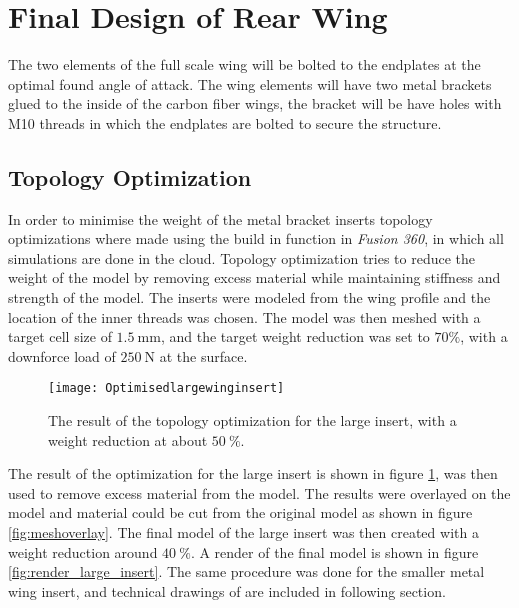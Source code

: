 \section{Final Design of Rear Wing}

  The two elements of the full scale wing will be bolted to the endplates at the optimal found angle of attack. The wing elements will have two metal brackets glued to the inside of the carbon fiber wings, the bracket will be have holes with M10 threads in which the endplates are bolted to secure the structure.

  \subsection{Topology Optimization}

  In order to minimise the weight of the metal bracket inserts topology optimizations where made using the build in function in \emph{Fusion 360}, in which all simulations are done in the cloud. Topology optimization tries to reduce the weight of the model by removing excess material while maintaining stiffness and strength of the model.
  The inserts were modeled from the wing profile and the location of the inner threads was chosen. The model was then meshed with a target cell size of $\SI{1.5}{\milli\metre}$, and the target weight reduction was set to $70\%$, with a downforce load of $\SI{250}{\newton}$ at the surface.

  \begin{figure}
    \texttt{[image: Optimisedlargewinginsert]}
    \caption{The result of the topology optimization for the large insert, with a weight reduction at about $\SI{50}{\%}$.}
    \label{fig:topology_large_insert}
  \end{figure}

  The result of the optimization for the large insert is shown in figure \ref{fig:topology_large_insert}, was then used to remove excess material from the model. The results were overlayed on the model and material could be cut from the original model as shown in figure
  \ref{fig:meshoverlay}. The final model of the large insert was then created with a weight reduction around $\SI{40}{\%}$. A render of the final model is shown in
  figure \ref{fig:render_large_insert}. The same procedure was done for the smaller metal wing insert, and technical drawings of are included in following section.


